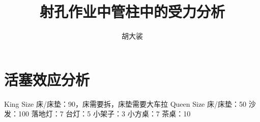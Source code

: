﻿\documentclass[UTF8]{ctexrep}
\begin{document}
\title{射孔作业中管柱中的受力分析}
\author{胡大裟}
\maketitle

\chapter{活塞效应分析}
King Size 床/床垫：90，床需要拆，床垫需要大车拉
Queen Size 床/床垫：50
沙发：100
落地灯：7
台灯：5
小架子：3
小方桌：7
茶桌：10
\end{document}
